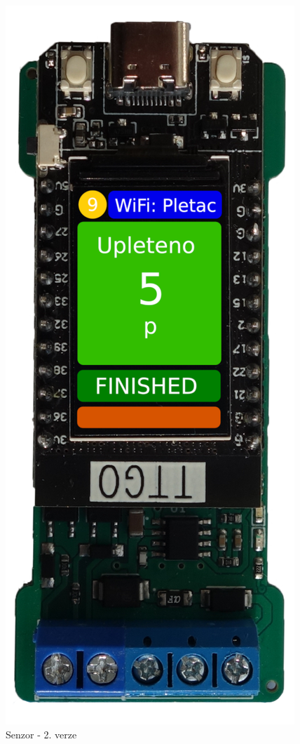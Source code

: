 \begin{figure}[htbp]
    \centering
    \includegraphics[width=\textwidth/3]{img/V2-deska-esp-screen.png}
    \caption{Senzor - 2. verze}
    \label{fig:SenzorV2}
\end{figure}


\newpage